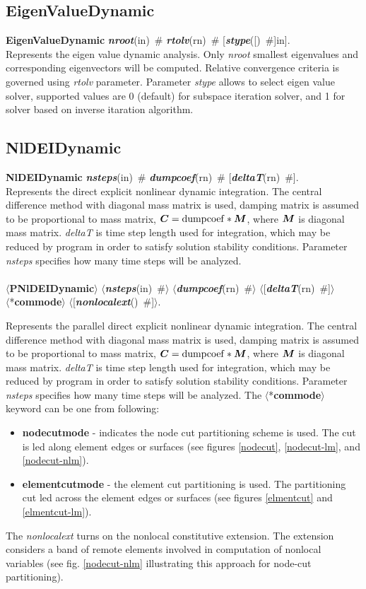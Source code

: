 \documentclass[draft]{article}
\newcommand{\mbf}[1]{\mbox{\boldmath$#1$}}
\newcommand{\param}[1]{{\em #1}}
\newcommand{\keywordnotype}[1]{\mbox{{\it{\bf{#1}}}}}
\newcommand{\keyword}[2]{\mbox{{\keywordnotype{#1}\tiny (#2)}}}
\newcommand{\entKeywordInst}[1]{\mbox{{\bf{{#1}}}}}
\newcommand{\field}[2]{\mbox{\keyword{#1}{#2}~\#}}
\newcommand{\optField}[2]{\mbox{[\field{#1}{#2}]}}
\newcommand{\Pmode}[1]{{\sffamily #1}}
\newcommand{\PentKeyword}[1]{\mbox{{$\langle$*{\bf{#1}}$\rangle$}}}
\newcommand{\PentKeywordInst}[1]{\mbox{$\langle${\bf{{#1}}}$\rangle$}}
\newcommand{\Pfield}[2]{\mbox{$\langle$\keyword{#1}{#2}~\#$\rangle$}}
\newcommand{\PoptField}[2]{\mbox{$\langle$[\field{#1}{#2}]$\rangle$}}
\begin{document}
\subsection{EigenValueDynamic}
\label{EigenValueDynamic}
\entKeywordInst{EigenValueDynamic} \field{nroot}{in}
\field{rtolv}{rn} \optField{stype}[in].\\
Represents the eigen value dynamic analysis.
Only \param{nroot} smallest eigenvalues and corresponding
eigenvectors will be computed. Relative convergence criteria is
governed using \param{rtolv} parameter.
Parameter \param{stype} allows to select eigen value solver, supported
values are 0 (default) for subspace iteration solver, and 1 for solver
based on inverse itaration algorithm.

\subsection{NlDEIDynamic}
\label{NlDEIDynamic}
\entKeywordInst{NlDEIDynamic} \field{nsteps}{in}
\field{dumpcoef}{rn} \optField{deltaT}{rn}.\\
Represents the direct explicit  nonlinear dynamic  integration.
The central difference method with diagonal mass matrix is used,
damping matrix is assumed to be proportional to mass matrix, $\mbf{C}
= {\rm dumpcoef} * \mbf{M}$, where
$\mbf{M}$ is diagonal mass matrix. \param{deltaT} is time step length used for
integration, which may be reduced by program in order to satisfy
solution stability conditions. Parameter \param{nsteps} specifies
how many time steps will be analyzed.
\\ \\
\noindent
\PentKeywordInst{PNlDEIDynamic} \Pfield{nsteps}{in}
\Pfield{dumpcoef}{rn} \PoptField{deltaT}{rn} \\\PentKeyword{commode} \PoptField{nonlocalext}{}.\\
\Pmode{
Represents the parallel direct explicit  nonlinear dynamic  integration.
The central difference method with diagonal mass matrix is used,
damping matrix is assumed to be proportional to mass matrix, $\mbf{C}
= {\rm dumpcoef} * \mbf{M}$, where
$\mbf{M}$ is diagonal mass matrix. \param{deltaT} is time step length used for
integration, which may be reduced by program in order to satisfy
solution stability conditions. Parameter \param{nsteps} specifies
how many time steps will be analyzed.
The \PentKeyword{commode} keyword can be one from following:
\begin{itemize}
\item \entKeywordInst{nodecutmode} - indicates the node cut partitioning scheme is
used. The cut is led along element edges or surfaces (see
figures \ref{nodecut}, \ref{nodecut-lm}, and \ref{nodecut-nlm}).
\item \entKeywordInst{elementcutmode} - the element cut partitioning is used. The
partitioning cut led across the element edges or surfaces (see 
figures \ref{elmentcut} and \ref{elmentcut-lm}).
\end{itemize}
\Pmode{
The \param{nonlocalext} turns on the nonlocal constitutive
extension. The extension considers a band of remote elements involved
in computation of nonlocal variables (see fig. \ref{nodecut-nlm} illustrating
this approach for node-cut partitioning).
}
}
\end{document}
